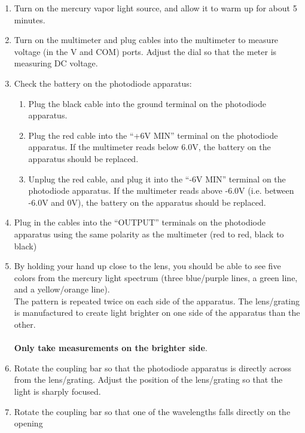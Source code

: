 

{}


{}

\begin{enumerate}
	\item {Turn on the mercury vapor light source, and allow it to warm up for about 5 minutes.}
	\item {Turn on the multimeter and plug cables into the multimeter to measure voltage (in
the V and COM) ports. Adjust the dial so that the meter is measuring DC voltage.}
	\item {Check the battery on the photodiode apparatus:}
	\begin{enumerate}
	\item {Plug the black cable into the ground terminal on the photodiode apparatus.}
	\item {Plug the red cable into the “+6V MIN” terminal on the photodiode apparatus. If
the multimeter reads below 6.0V, the battery on the apparatus should be replaced.}
	\item {Unplug the red cable, and plug it into the “-6V MIN” terminal on the photodiode
apparatus. If the multimeter reads above -6.0V (i.e. between -6.0V and 0V), the
battery on the apparatus should be replaced.}
	\end{enumerate}
	\item {Plug in the cables into the “OUTPUT” terminals on the photodiode apparatus using
the same polarity as the multimeter (red to red, black to black)}
	\item {By holding your hand up close to the lens, you should be able to see five colors from
the mercury light spectrum (three blue/purple lines, a green line, and a yellow/orange
line). \\ The pattern is repeated twice on each side of the apparatus. The lens/grating
is manufactured to create light brighter on one side of the apparatus than the other. \\ \\
\textbf{Only take measurements on the brighter side}.}
	\item {Rotate the coupling bar so that the photodiode apparatus is directly across from the
lens/grating. Adjust the position of the lens/grating so that the light is sharply focused.}
	\item {Rotate the coupling bar so that one of the wavelengths falls directly on the opening
}
\end{enumerate}
